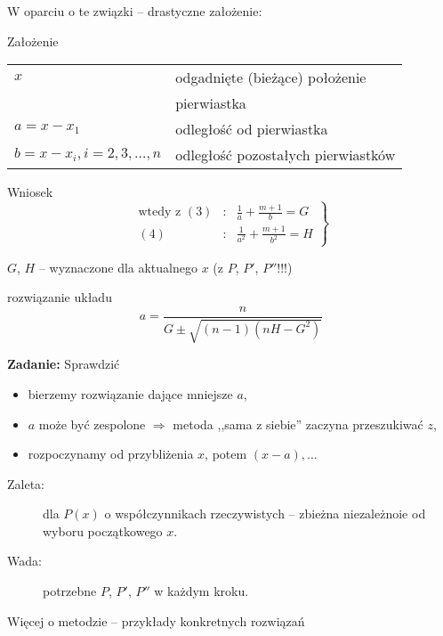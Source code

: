 \begin{frame}
  W oparciu o te związki -- drastyczne założenie:
  \begin{block}{Założenie}
    \begin{tabular}{ll}
      $x$ & odgadnięte (bieżące) położenie \\
      & pierwiastka \\
      $a = x - x_1$ & odległość od pierwiastka \\
      $b = x - x_i, i = 2,3, \dots , n$ & odległość pozostałych pierwiastków
    \end{tabular}
  \end{block}

  \begin{block}{Wniosek}
    $$ \left. \begin{array}{rcl}
      \text{wtedy z } (3) & : & \frac{1}{a} + \frac{m+1}{b} = G \\ %
      (4) & : & \frac{1}{a^2} + \frac{m+1}{b^2} = H
    \end{array} \right\} $$
  \end{block}

$G$, $H$ -- wyznaczone dla aktualnego $x$ (z $P$, $P'$, $P''$!!!)
\end{frame}

\begin{frame}
  \begin{block}{rozwiązanie układu}
    $$a = \frac{n}{G \pm \sqrt{(n-1)(nH-G^2)}}$$
  \end{block}

  \textbf{Zadanie:} Sprawdzić

  \begin{itemize}
    \item bierzemy rozwiązanie dające mniejsze $a$,
    \item $a$ może być zespolone $\Rightarrow$ metoda ,,sama z siebie'' zaczyna przeszukiwać $z$, %
    \item rozpoczynamy od przybliżenia $x$, potem $(x-a),\dots $
  \end{itemize}
\end{frame}

\begin{frame}
  \begin{block}{}
    \begin{description}
      \item[Zaleta:] dla $P(x)$ o współczynnikach rzeczywistych -- zbieżna niezależnoie od wyboru początkowego $x$.
      \item[Wada:] potrzebne $P$, $P'$, $P''$ w każdym kroku.
    \end{description}
  \end{block}

  Więcej o metodzie -- przykłady konkretnych rozwiązań \cite{Adams}
\end{frame}
